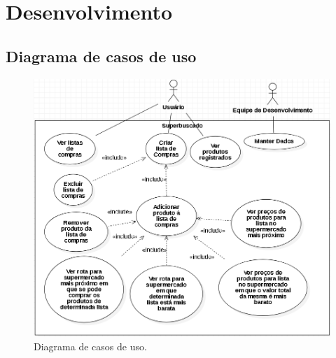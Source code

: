 \chapter{Desenvolvimento}

\section{Diagrama de casos de uso}
\begin{figure}[H]
	\centering
		\caption{Diagrama de casos de uso.}
		\includegraphics[scale=0.4]{Imagens/DiagramaDeCasosDeUso.png}
\end{figure}



